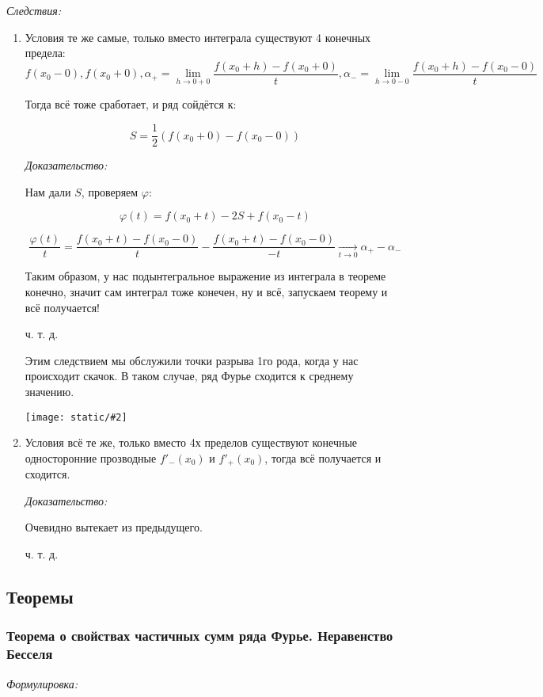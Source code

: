 \documentclass{article}
\def\images#1#2{\begin{center}\texttt{[image: static/\#2]}\end{center}}
\def\goesto#1{\underset{#1}{\longrightarrow}}
\begin{document}
\textit{Следствия:}

\begin{enumerate}
    \item Условия те же самые, только вместо интеграла существуют 4 конечных предела:
    \[f(x_0 - 0), f(x_0 + 0), \alpha_+ = \lim_{h \rightarrow 0 + 0} \frac{f(x_0 + h) - f(x_0 + 0)}{t}, \alpha_- = \lim_{h \rightarrow 0 - 0} \frac{f(x_0 + h) - f(x_0 - 0)}{t}\]

    Тогда всё тоже сработает, и ряд сойдётся к:

    \[S = \frac{1}{2}(f(x_0 + 0) - f(x_0 - 0))\]

    \textit{Доказательство: }


    Нам дали $S$, проверяем $\varphi$:

    \[\varphi(t) = f(x_0 + t) - 2S + f(x_0 - t)\]

    \[\frac{\varphi(t)}{t} = \frac{f(x_0 + t) - f(x_0 - 0)}{t} - \frac{f(x_0 + t) - f(x_0 - 0)}{-t} \goesto{t \rightarrow 0} \alpha_+ - \alpha_-\]

    Таким образом, у нас подынтегральное выражение из интеграла в теореме конечно, значит сам интеграл тоже конечен, ну и всё, запускаем теорему и всё получается!

    ч. т. д.

    Этим следствием мы обслужили точки разрыва 1го рода, когда у нас происходит скачок. В таком случае, ряд Фурье сходится к среднему значению.

    \images{0.3}{priznak_dini.jpg}

    \item Условия всё те же, только вместо 4х пределов существуют конечные односторонние прозводные $f'_-(x_0)$ и $f'_+(x_0)$, тогда всё получается и сходится.
    
    \textit{Доказательство:}

    Очевидно вытекает из предыдущего.

    ч. т. д.
\end{enumerate}

\newpage
\subsection{Теоремы}

\subsubsection{Теорема о свойствах частичных сумм ряда Фурье. Неравенство Бесселя}
\textit{Формулировка:}
\end{document}
